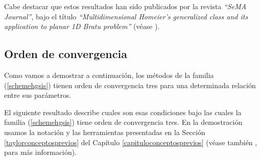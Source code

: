 Cabe destacar que estos resultados han sido publicados por la revista \textit{``SeMA Journal''}, bajo el título \textit{``Multidimensional Homeier’s generalized class and its application to planar 1D Bratu problem''} (véase \cite{paperhomeiersistemas}).

\subsection{Orden de convergencia}\label{ordenhgsistemas}
Como vamos a demostrar a continuación, los métodos de la familia (\ref{schemehgsis}) tienen orden de convergencia tres para una determinada relación entre sus parámetros.

El siguiente resultado describe cuales son esas condiciones bajo las cuales la familia (\ref{schemehgsis}) tiene orden de convergencia tres. En la demostración usamos la notación y las herramientas presentadas en la Sección \ref{taylorconceptosprevios} del Capítulo \ref{capituloconceptosprevios} (véase también \cite{CHMT}, para más información).

